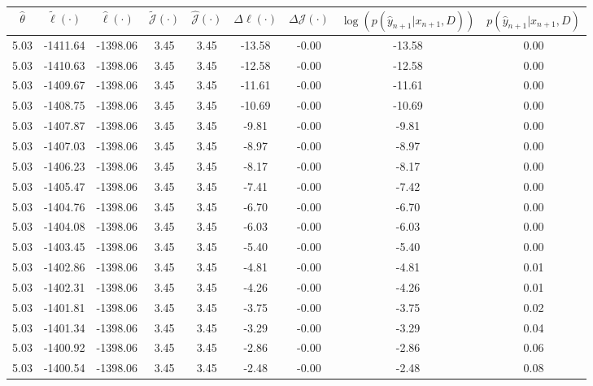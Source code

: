 \begin{table}[htbp]
        \centering
        \tiny
        \begin{adjustbox}{angle=90}
            \begin{tabular}{|c|c|c|c|c|c|c|c|c|}
                \hline
                 $\hat{\theta}$ & $\tilde{\ell}(\cdot)$ & $\hat{\ell}(\cdot)$ & $\tilde{\mathcal{J}}(\cdot)$ & $\hat{\mathcal{J}}(\cdot)$ & $\Delta \ell(\cdot)$ & $\Delta \mathcal{J}(\cdot)$ & $\log(p(\hat{y}_{n+1}|x_{n+1}, D))$ & $p(\hat{y}_{n+1}|x_{n+1}, D)$ \\
                \hline
                 5.03 & -1411.64 & -1398.06 & 3.45 & 3.45 & -13.58 & -0.00 & -13.58 & 0.00\\ \hline
 5.03 & -1410.63 & -1398.06 & 3.45 & 3.45 & -12.58 & -0.00 & -12.58 & 0.00\\ \hline
 5.03 & -1409.67 & -1398.06 & 3.45 & 3.45 & -11.61 & -0.00 & -11.61 & 0.00\\ \hline
 5.03 & -1408.75 & -1398.06 & 3.45 & 3.45 & -10.69 & -0.00 & -10.69 & 0.00\\ \hline
 5.03 & -1407.87 & -1398.06 & 3.45 & 3.45 & -9.81 & -0.00 & -9.81 & 0.00\\ \hline
 5.03 & -1407.03 & -1398.06 & 3.45 & 3.45 & -8.97 & -0.00 & -8.97 & 0.00\\ \hline
 5.03 & -1406.23 & -1398.06 & 3.45 & 3.45 & -8.17 & -0.00 & -8.17 & 0.00\\ \hline
 5.03 & -1405.47 & -1398.06 & 3.45 & 3.45 & -7.41 & -0.00 & -7.42 & 0.00\\ \hline
 5.03 & -1404.76 & -1398.06 & 3.45 & 3.45 & -6.70 & -0.00 & -6.70 & 0.00\\ \hline
 5.03 & -1404.08 & -1398.06 & 3.45 & 3.45 & -6.03 & -0.00 & -6.03 & 0.00\\ \hline
 5.03 & -1403.45 & -1398.06 & 3.45 & 3.45 & -5.40 & -0.00 & -5.40 & 0.00\\ \hline
 5.03 & -1402.86 & -1398.06 & 3.45 & 3.45 & -4.81 & -0.00 & -4.81 & 0.01\\ \hline
 5.03 & -1402.31 & -1398.06 & 3.45 & 3.45 & -4.26 & -0.00 & -4.26 & 0.01\\ \hline
 5.03 & -1401.81 & -1398.06 & 3.45 & 3.45 & -3.75 & -0.00 & -3.75 & 0.02\\ \hline
 5.03 & -1401.34 & -1398.06 & 3.45 & 3.45 & -3.29 & -0.00 & -3.29 & 0.04\\ \hline
 5.03 & -1400.92 & -1398.06 & 3.45 & 3.45 & -2.86 & -0.00 & -2.86 & 0.06\\ \hline
 5.03 & -1400.54 & -1398.06 & 3.45 & 3.45 & -2.48 & -0.00 & -2.48 & 0.08\\ \hline

\end{tabular}
\end{adjustbox}
\end{table}

